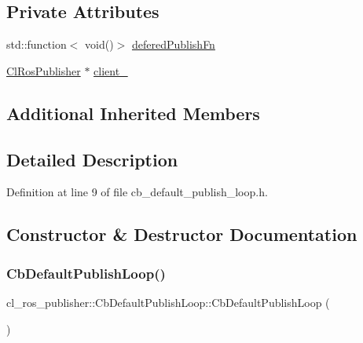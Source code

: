 \subsection*{Private Attributes}
\begin{DoxyCompactItemize}
\item 
std\+::function$<$ void()$>$ \hyperlink{classcl__ros__publisher_1_1CbDefaultPublishLoop_ac0044704637edbd8f79a69d5b06de9ba}{defered\+Publish\+Fn}
\item 
\hyperlink{classcl__ros__publisher_1_1ClRosPublisher}{Cl\+Ros\+Publisher} $\ast$ \hyperlink{classcl__ros__publisher_1_1CbDefaultPublishLoop_a483b8c34b88dadc718fbf4bf1f95acb5}{client\+\_\+}
\end{DoxyCompactItemize}
\subsection*{Additional Inherited Members}


\subsection{Detailed Description}


Definition at line 9 of file cb\+\_\+default\+\_\+publish\+\_\+loop.\+h.



\subsection{Constructor \& Destructor Documentation}
\mbox{\label{classcl__ros__publisher_1_1CbDefaultPublishLoop_a6453198599bad62306f4246f6ac725b5}} 
\subsubsection{\texorpdfstring{Cb\+Default\+Publish\+Loop()}{CbDefaultPublishLoop()}\hspace{0.1cm}{\footnotesize\ttfamily [1/2]}}
{\footnotesize\ttfamily cl\+\_\+ros\+\_\+publisher\+::\+Cb\+Default\+Publish\+Loop\+::\+Cb\+Default\+Publish\+Loop (\begin{DoxyParamCaption}{ }\end{DoxyParamCaption})\hspace{0.3cm}{\ttfamily [inline]}}



